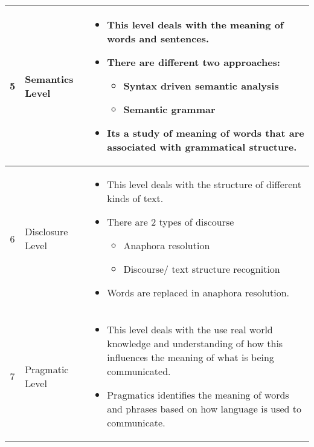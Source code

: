 \begin{longtable}{|c|m{2.7cm}|m{10cm}|}
    5 & Semantics Level & \begin{itemize}
        \item This level deals with the meaning of words and sentences.
        \item There are different two approaches:
        \begin{itemize}
            \item Syntax driven semantic analysis
            \item Semantic grammar
        \end{itemize} 
        \item Its a study of meaning of words that are associated with grammatical structure.
    \end{itemize} \\ \hline

    6 & Disclosure Level & \begin{itemize}
        \item This level deals with the structure of different kinds of text.
        \item There are 2 types of discourse
        \begin{itemize}
            \item Anaphora resolution
            \item Discourse/ text structure recognition
        \end{itemize}
        \item Words are replaced in anaphora resolution.
    \end{itemize} \\ \hline

    7 & Pragmatic Level & \begin{itemize}
        \item This level deals with the use real world knowledge and understanding of how this influences the meaning of what is being communicated.
        \item Pragmatics identifies the meaning of words and phrases based on how language is used to communicate.
    \end{itemize}

\end{longtable}































